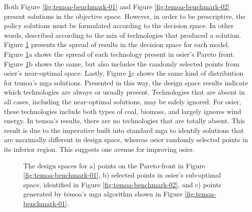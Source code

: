 Both Figure \ref{fig:temoa-benchmark-01} and Figure \ref{fig:temoa-benchmark-02}
present solutions in the objective space. However, in order to be prescriptive,
the policy solutions must be formulated according to the decision space. In
other words, described according to the mix of technologies that produced a
solution. Figure \ref{fig:temoa-benchmark-03} presents the spread of results in
the decision space for each model. Figure \ref{fig:temoa-benchmark-03}a shows
the spread of each technology present in \ac{osier}'s Pareto front. Figure
\ref{fig:temoa-benchmark-03}b shows the same, but also includes the randomly
selected points from \ac{osier}'s near-optimal space. Lastly, Figure
\ref{fig:temoa-benchmark-03}c shows the same kind of distribution for
\ac{temoa}'s \ac{mga} solutions. Presented in this way, the design space results
indicate which technologies are always or usually present. Technologies that are
absent in all cases, including the near-optimal solutions, may be safely
ignored. For \ac{osier}, these technologies include both types of coal, biomass,
and largely ignores wind energy. In \ac{temoa}'s results, there are no
technologies that are totally absent. This result is due to the imperative built
into standard \ac{mga} to identify solutions that are maximally different in
design space, whereas \ac{osier} randomly selected points in its inferior
region. This suggests one avenue for improving \ac{osier}.

\newpage
\begin{figure}[ht!]
  \centering
  \resizebox{\columnwidth}{!}{}
  \caption{The design spaces for a) points on the Pareto-front in Figure
  \ref{fig:temoa-benchmark-01}, b) selected points in \ac{osier}'s sub-optimal
  space, identified in Figure \ref{fig:temoa-benchmark-02}, and c) points
  generated by \ac{temoa}'s \ac{mga} algorithm shown in Figure
  \ref{fig:temoa-benchmark-01}.}
  \label{fig:temoa-benchmark-03}
\end{figure}



